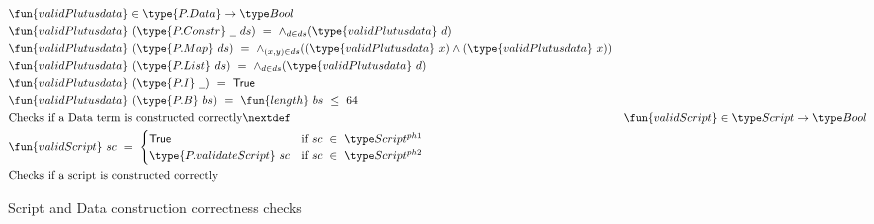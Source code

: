\begin{figure*}[htb]
  \begin{align*}
    & \fun{validPlutusdata} \in \type{P.Data} \to \Bool \\
    & \fun{validPlutusdata}~ (\type{P.Constr} ~\wcard ~ds) ~=~ \wedge_{d\in ds} (\type{validPlutusdata}~d) \\
    & \fun{validPlutusdata}~ (\type{P.Map}~ ds) ~=~ \wedge_{(x,y)\in ds} ((\type{validPlutusdata}~x) \wedge (\type{validPlutusdata}~x)) \\
    & \fun{validPlutusdata} ~(\type{P.List}~ ds) ~=~  \wedge_{d\in ds} (\type{validPlutusdata}~d) \\
    & \fun{validPlutusdata}~ (\type{P.I}~ \wcard) ~=~ \True \\
    & \fun{validPlutusdata}~ (\type{P.B}~ bs) ~=~ \fun{length} ~bs~ \leq~ 64 \\
    & \text{Checks if a Data term is constructed correctly}
    \nextdef
    & \fun{validScript} \in \Script \to \Bool \\
    & \fun{validScript} ~sc~=~\begin{cases}
      \True & \text{if $sc~\in~\ScriptPhOne$} \\
      \type{P.validateScript} ~sc & \text{if $sc~\in~\ScriptPhTwo$}
    \end{cases} \\
    & \text{Checks if a script is constructed correctly}
  \end{align*}
  \caption{Script and Data construction correctness checks}
  \label{fig:data-script-check}
\end{figure*}
